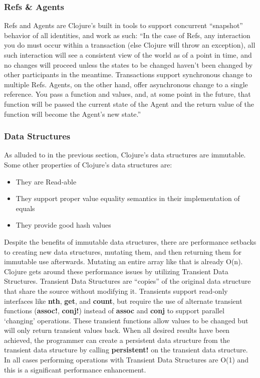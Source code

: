 \subsubsection{Refs \& Agents}

    Refs and Agents are Clojure's built in tools to support concurrent ``snapshot'' behavior of all identities, and work as such: ``In the case of Refs, any interaction you do must occur within a transaction (else Clojure will throw an exception), all such interaction will see a consistent view of the world as of a point in time, and no changes will proceed unless the states to be changed haven’t been changed by other participants in the meantime. Transactions support synchronous change to multiple Refs. Agents, on the other hand, offer asynchronous change to a single reference. You pass a function and values, and, at some point in the future, that function will be passed the current state of the Agent and the return value of the function will become the Agent’s new state.'' \cite{website:clojure-concurrency}
    
    

\subsubsection{Data Structures}
    
    As alluded to in the previous section, Clojure's data structures are immutable. Some other properties of Clojure's data structures are:
    \begin{itemize}
        \item They are Read-able
        \item They support proper value equality semantics in their implementation of equals
        \item They provide good hash values
    \end{itemize}
    \cite{website:clojure-lang-reference} Despite the benefits of immutable data structures, there are performance setbacks to creating new data structures, mutating them, and then returning them for immutable use afterwards. Mutating an entire array like that is already O(n). Clojure gets around these performance issues by utilizing Transient Data Structures. Transient Data Structures are ``copies'' of the original data structure that share the source without modifying it. Transients support read-only interfaces like \textbf{nth}, \textbf{get}, and \textbf{count}, but require the use of alternate transient functions (\textbf{assoc!}, \textbf{conj!}) instead of \textbf{assoc} and \textbf{conj} to support parallel `changing' operations. These transient functions allow values to be changed but will only return transient values back. When all desired results have been achieved, the programmer can create a persistent data structure from the transient data structure by calling \textbf{persistent!} on the transient data structure. In all cases performing operations with Transient Data Structures are O(1) and this is a significant performance enhancement.
    
